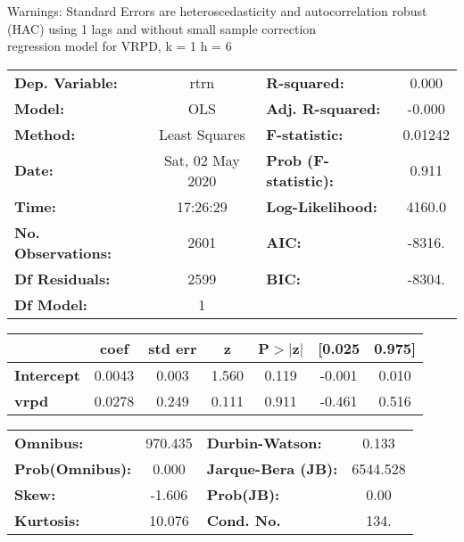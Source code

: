 Warnings: \newline
 [1] Standard Errors are heteroscedasticity and autocorrelation robust (HAC) using 1 lags and without small sample correction\\ 

regression model for VRPD, k = 1 h = 6\begin{center}
\begin{tabular}{lclc}
\toprule
\textbf{Dep. Variable:}    &       rtrn       & \textbf{  R-squared:         } &     0.000   \\
\textbf{Model:}            &       OLS        & \textbf{  Adj. R-squared:    } &    -0.000   \\
\textbf{Method:}           &  Least Squares   & \textbf{  F-statistic:       } &   0.01242   \\
\textbf{Date:}             & Sat, 02 May 2020 & \textbf{  Prob (F-statistic):} &    0.911    \\
\textbf{Time:}             &     17:26:29     & \textbf{  Log-Likelihood:    } &    4160.0   \\
\textbf{No. Observations:} &        2601      & \textbf{  AIC:               } &    -8316.   \\
\textbf{Df Residuals:}     &        2599      & \textbf{  BIC:               } &    -8304.   \\
\textbf{Df Model:}         &           1      & \textbf{                     } &             \\
\bottomrule
\end{tabular}
\begin{tabular}{lcccccc}
                   & \textbf{coef} & \textbf{std err} & \textbf{z} & \textbf{P$> |$z$|$} & \textbf{[0.025} & \textbf{0.975]}  \\
\midrule
\textbf{Intercept} &       0.0043  &        0.003     &     1.560  &         0.119        &       -0.001    &        0.010     \\
\textbf{vrpd}      &       0.0278  &        0.249     &     0.111  &         0.911        &       -0.461    &        0.516     \\
\bottomrule
\end{tabular}
\begin{tabular}{lclc}
\textbf{Omnibus:}       & 970.435 & \textbf{  Durbin-Watson:     } &    0.133  \\
\textbf{Prob(Omnibus):} &   0.000 & \textbf{  Jarque-Bera (JB):  } & 6544.528  \\
\textbf{Skew:}          &  -1.606 & \textbf{  Prob(JB):          } &     0.00  \\
\textbf{Kurtosis:}      &  10.076 & \textbf{  Cond. No.          } &     134.  \\
\bottomrule
\end{tabular}
\end{center}

